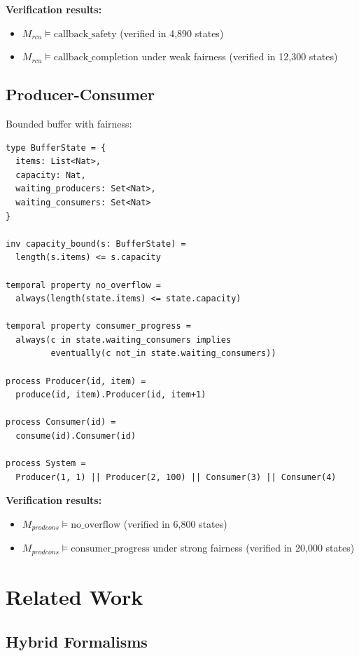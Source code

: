 \documentclass[conference]{IEEEtran}
\begin{document}
\textbf{Verification results:}
\begin{itemize}
\item $M_{rcu} \models \text{callback\_safety}$ (verified in 4,890 states)
\item $M_{rcu} \models \text{callback\_completion}$ under weak fairness (verified in 12,300 states)
\end{itemize}

\subsection{Producer-Consumer}

Bounded buffer with fairness:

\begin{lstlisting}[caption={Producer-Consumer TSM}]
type BufferState = {
  items: List<Nat>,
  capacity: Nat,
  waiting_producers: Set<Nat>,
  waiting_consumers: Set<Nat>
}

inv capacity_bound(s: BufferState) =
  length(s.items) <= s.capacity

temporal property no_overflow =
  always(length(state.items) <= state.capacity)

temporal property consumer_progress =
  always(c in state.waiting_consumers implies
         eventually(c not_in state.waiting_consumers))

process Producer(id, item) =
  produce(id, item).Producer(id, item+1)

process Consumer(id) =
  consume(id).Consumer(id)

process System =
  Producer(1, 1) || Producer(2, 100) || Consumer(3) || Consumer(4)
\end{lstlisting}

\textbf{Verification results:}
\begin{itemize}
\item $M_{prodcons} \models \text{no\_overflow}$ (verified in 6,800 states)
\item $M_{prodcons} \models \text{consumer\_progress}$ under strong fairness (verified in 20,000 states)
\end{itemize}

\section{Related Work}

\subsection{Hybrid Formalisms}
\end{document}
